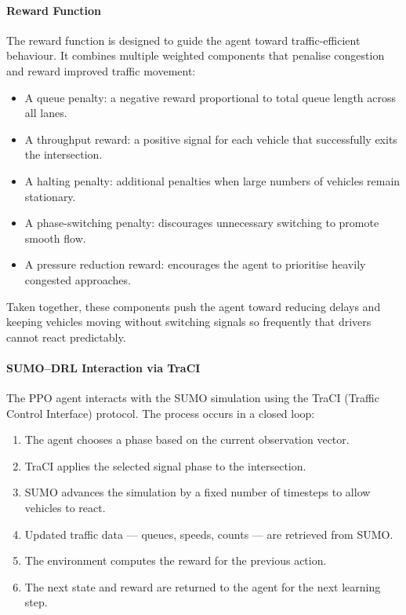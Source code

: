 \documentclass[11pt, a4paper]{report}
\begin{document}
\paragraph{Reward Function}

The reward function is designed to guide the agent toward traffic-efficient behaviour. It combines multiple weighted components that penalise congestion and reward improved traffic movement:

\begin{itemize}
    \item A queue penalty: a negative reward proportional to total queue length across all lanes.
    \item A throughput reward: a positive signal for each vehicle that successfully exits the intersection.
    \item A halting penalty: additional penalties when large numbers of vehicles remain stationary.
    \item A phase-switching penalty: discourages unnecessary switching to promote smooth flow.
    \item A pressure reduction reward: encourages the agent to prioritise heavily congested approaches.
\end{itemize}

Taken together, these components push the agent toward reducing delays and keeping vehicles moving without switching signals so frequently that drivers cannot react predictably.

\paragraph{SUMO--DRL Interaction via TraCI}

The PPO agent interacts with the SUMO simulation using the TraCI (Traffic Control Interface) protocol. The process occurs in a closed loop:

\begin{enumerate}
    \item The agent chooses a phase based on the current observation vector.
    \item TraCI applies the selected signal phase to the intersection.
    \item SUMO advances the simulation by a fixed number of timesteps to allow vehicles to react.
    \item Updated traffic data --- queues, speeds, counts --- are retrieved from SUMO.
    \item The environment computes the reward for the previous action.
    \item The next state and reward are returned to the agent for the next learning step.
\end{enumerate}
\end{document}
